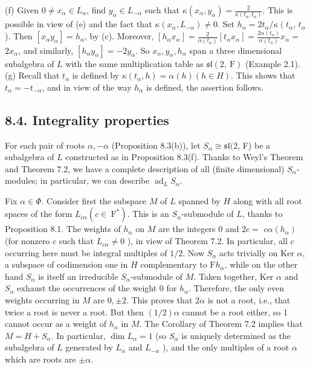 \documentclass[10pt]{article}
\begin{document}
(f) Given $0 \neq x_{\alpha} \in L_{\alpha}$, find $y_{\alpha} \in L_{-\alpha}$ such that $\kappa\left(x_{\alpha}, y_{\alpha}\right)=\frac{2}{\kappa\left(t_{\alpha}, t_{\alpha}\right)}$. This is possible in view of (e) and the fact that $\kappa\left(x_{\alpha}, L_{-\alpha}\right) \neq 0$. Set $h_{\alpha}=2 t_{\alpha} / \kappa\left(t_{\alpha}\right.$, $t_{\alpha}$ ). Then $\left[x_{\alpha} y_{\alpha}\right]=h_{\alpha}$, by (c). Moreover, $\left[h_{\alpha} x_{\alpha}\right]=\frac{2}{\alpha\left(t_{\alpha}\right)}\left[t_{\alpha} x_{\alpha}\right]=\frac{2 \alpha\left(t_{\alpha}\right)}{\alpha\left(t_{\alpha}\right)} x_{\alpha}=$ $2 x_{\alpha}$, and similarly, $\left[h_{\alpha} y_{\alpha}\right]=-2 y_{\alpha}$. So $x_{\alpha}, y_{\alpha}, h_{\alpha}$ span a three dimensional subalgebra of $L$ with the same multiplication table as $\mathfrak{s l}(2, \mathrm{~F})$ (Example 2.1).\\
(g) Recall that $t_{\alpha}$ is defined by $\kappa\left(t_{\alpha}, h\right)=\alpha(h)(h \in H)$. This shows that $t_{\alpha}=-t_{-\alpha}$, and in view of the way $h_{\alpha}$ is defined, the assertion follows.

\subsection*{8.4. Integrality properties}
For each pair of roots $\alpha,-\alpha$ (Proposition 8.3(b)), let $S_{\alpha} \cong \mathfrak{s l}(2$, F) be a subalgebra of $L$ constructed as in Proposition 8.3(f). Thanks to Weyl's Theorem and Theorem 7.2, we have a complete description of all (finite dimensional) $S_{\alpha}$-modules; in particular, we can describe $\operatorname{ad}_{L} S_{\alpha}$.

Fix $\alpha \in \Phi$. Consider first the subspace $M$ of $L$ spanned by $H$ along with all root spaces of the form $L_{c \alpha}\left(c \in \mathrm{~F}^{*}\right)$. This is an $S_{\alpha}$-submodule of $L$, thanks to Proposition 8.1. The weights of $h_{\alpha}$ on $M$ are the integers 0 and $2 c=$ $c \alpha\left(h_{\alpha}\right)$ (for nonzero $c$ such that $L_{c \alpha} \neq 0$ ), in view of Theorem 7.2. In particular, all $c$ occurring here must be integral multiples of $1 / 2$. Now $S_{\alpha}$ acts trivially on Ker $\alpha$, a subspace of codimension one in $H$ complementary to $\mathrm{F} h_{\alpha}$, while on the other hand $S_{\alpha}$ is itself an irreducible $S_{\alpha}$-submodule of $M$. Taken together, Ker $\alpha$ and $S_{\alpha}$ exhaust the occurrences of the weight 0 for $h_{\alpha}$. Therefore, the only even weights occurring in $M$ are $0, \pm 2$. This proves that $2 \alpha$ is not a root, i.e., that twice a root is never a root. But then $(1 / 2) \alpha$ cannot be a root either, so 1 cannot occur as a weight of $h_{\alpha}$ in $M$. The Corollary of Theorem 7.2 implies that $M=H+S_{\alpha}$. In particular, $\operatorname{dim} L_{\alpha}=1$ (so $S_{\alpha}$ is uniquely determined as the subalgebra of $L$ generated by $L_{\alpha}$ and $L_{-\alpha}$ ), and the only multiples of a root $\alpha$ which are roots are $\pm \alpha$.
\end{document}
